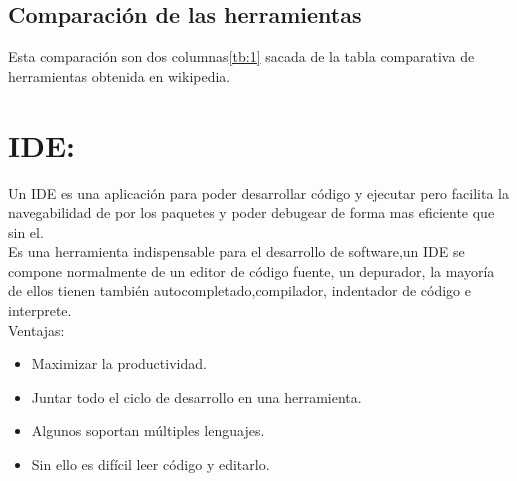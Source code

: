 \subsection{Comparación de las herramientas}
Esta comparación son dos columnas\ref{tb:1} sacada de la tabla comparativa de herramientas obtenida en wikipedia.


\begin{table}[]
\centering
\caption{Tabla comparativa de herramientas}
\label{tb:1}
\end{table}
\section{IDE:}
Un IDE es una aplicación para poder desarrollar código y ejecutar pero facilita la navegabilidad de por los paquetes y poder debugear de forma mas eficiente que sin el.\\
Es una herramienta indispensable para el desarrollo de software,un IDE se compone normalmente de un editor de código fuente, un depurador, la mayoría de ellos tienen también autocompletado,compilador, indentador de código e interprete.\\
Ventajas:
\begin{itemize}
	\item Maximizar la productividad.
	\item Juntar todo el ciclo de desarrollo en una herramienta.
	\item Algunos soportan múltiples lenguajes. 
	\item Sin ello es difícil leer código y editarlo.
\end{itemize}

